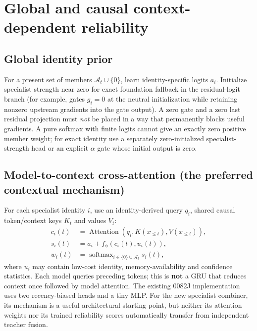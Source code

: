 \documentclass[11pt,letterpaper]{article}
\newcommand{\softmax}{\operatorname{softmax}}
\begin{document}
\section{Global and causal context-dependent reliability}
\label{sec:gating}
\subsection{Global identity prior}
For a present set of members $\mathcal A_t\cup\{0\}$, learn identity-specific logits $a_i$. Initialize specialist strength near zero for exact foundation fallback in the residual-logit branch (for example, gates $g_i=0$ at the neutral initialization while retaining nonzero upstream gradients into the gate output). A zero gate and a zero last residual projection must \emph{not} be placed in a way that permanently blocks useful gradients. A pure softmax with finite logits cannot give an exactly zero positive member weight; for exact identity use a separately zero-initialized specialist-strength head or an explicit $\alpha$ gate whose initial output is zero.

\subsection{Model-to-context cross-attention (the preferred contextual mechanism)}
For each specialist identity $i$, use an identity-derived query $q_i$, shared causal token/context keys $K_t$ and values $V_t$:
\begin{align}
 c_i(t)&=\operatorname{Attention}\!\left(q_i,K(x_{\le t}),V(x_{\le t})\right),\\
 s_i(t)&=a_i+f_\phi(c_i(t),u_i(t)),\\
 w_i(t)&=\softmax_{i\in\{0\}\cup\mathcal A_t}s_i(t),
 \label{eq:modelquery}
\end{align}
where $u_i$ may contain low-cost identity, memory-availability and confidence statistics. Each model queries preceding tokens; this is \textbf{not} a GRU that reduces context once followed by model attention. The existing 0082J implementation uses two recency-biased heads and a tiny MLP. For the new specialist combiner, its mechanism is a useful architectural starting point, but neither its attention weights nor its trained reliability scores automatically transfer from independent teacher fusion.
\end{document}
